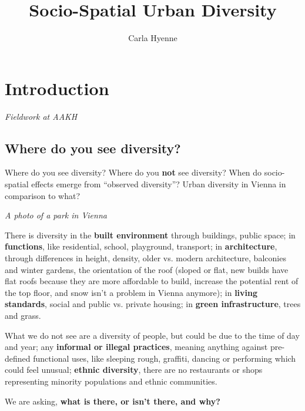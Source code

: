 \documentclass{article}
\title{Socio-Spatial Urban Diversity}
\author{Carla Hyenne}
\begin{document}
\maketitle

\tableofcontents

\pagebreak

\section{Introduction}
\textit{Fieldwork at AAKH}

\subsection{Where do you see diversity?}

Where do you see diversity? Where do you \textbf{not} see diversity? When do socio-spatial effects emerge from ``observed diversity''? Urban diversity in Vienna in comparison to what?

\textit{A photo of a park in Vienna}

There is diversity in the \textbf{built environment} through buildings, public space; in \textbf{functions}, like residential, school, playground, transport; in \textbf{architecture}, through differences in height, density, older vs. modern architecture, balconies and winter gardens, the orientation of the roof (sloped or flat, new builds have flat roofs because they are more affordable to build, increase the potential rent of the top floor, and snow isn't a problem in Vienna anymore); in \textbf{living standards}, social and public vs. private housing; in \textbf{green infrastructure}, trees and grass.

What we do not see are a diversity of people, but could be due to the time of day and year; any \textbf{informal or illegal practices}, meaning anything against pre-defined functional uses, like sleeping rough, graffiti, dancing or performing which could feel unusual; \textbf{ethnic diversity}, there are no restaurants or shops representing minority populations and ethnic communities.

We are asking, \textbf{what is there, or isn't there, and why?}
\end{document}
